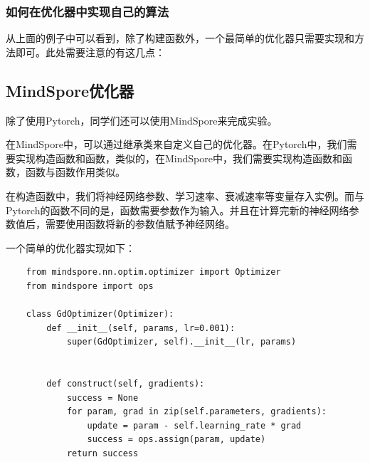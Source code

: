 \subsubsection{如何在优化器中实现自己的算法}

从上面的例子中可以看到，除了构建函数外，一个最简单的优化器只需要实现和方法即可。此处需要注意的有这几点：

\subsection{MindSpore优化器}

除了使用Pytorch，同学们还可以使用MindSpore来完成实验。

在MindSpore中，可以通过继承类来自定义自己的优化器。在Pytorch中，我们需要实现构造函数和函数，类似的，在MindSpore中，我们需要实现构造函数和函数，函数与函数作用类似。

在构造函数中，我们将神经网络参数、学习速率、衰减速率等变量存入实例。而与Pytorch的函数不同的是，函数需要参数作为输入。并且在计算完新的神经网络参数值后，需要使用函数将新的参数值赋予神经网络。

一个简单的优化器实现如下：
\begin{lstlisting}
    from mindspore.nn.optim.optimizer import Optimizer
    from mindspore import ops

    class GdOptimizer(Optimizer):
        def __init__(self, params, lr=0.001):
            super(GdOptimizer, self).__init__(lr, params)

        
        def construct(self, gradients):
            success = None
            for param, grad in zip(self.parameters, gradients):
                update = param - self.learning_rate * grad
                success = ops.assign(param, update)
            return success
\end{lstlisting}

